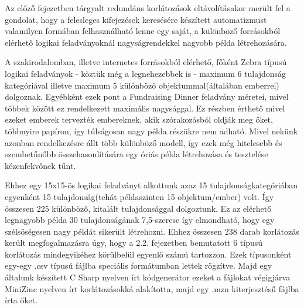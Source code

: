 \documentclass[12pt,a4paper,twoside, openright]{report}
\begin{document}
    Az előző fejezetben tárgyalt redundáns korlátozások eltávolításakor merült fel a gondolat, hogy a felesleges kifejezések keresésére készített automatizmust valamilyen formában felhasználható lenne egy saját, a különböző forrásokból elérhető logikai feladványoknál nagyságrendekkel nagyobb példa létrehozására.
    
    A szakirodalomban, illetve internetes forrásokból elérhető, főként Zebra típusú logikai feladványok - köztük még a legnehezebbek is - maximum 6 tulajdonság kategóriával illetve maximum 5 különböző objektummal(általában emberrel) dolgoznak. Egyébként ezek pont a Fundraising Dinner feladvány méretei, mivel többek között ez rendelkezett maximális nagysággal. Ez részben érthető mivel ezeket emberek tervezték embereknek, akik szórakozásból oldják meg őket, többnyire papíron, így túlságosan nagy példa részükre nem adható. Mivel nekünk azonban rendelkezésre állt több különböző modell, így ezek még hitelesebb és szembetűnőbb összehasonlítására egy óriás példa létrehozása és tesztelése kézenfekvőnek tűnt.
    
    Ehhez egy 15x15-ös logikai feladványt alkottunk azaz 15 tulajdonságkategóriában egyenként 15 tulajdonság(tehát példaszinten 15 objektum/ember) volt. Így összesen 225 különböző, kitalált tulajdonsággal dolgoztunk. Ez az elérhető legnagyobb példa 30 tulajdonságának 7,5-szerese így elmondható, hogy egy szélsőségesen nagy példát sikerült létrehozni. Ehhez összesen 238 darab korlátozás került megfogalmazásra úgy, hogy a 2.2. fejezetben bemutatott 6 típusú korlátozás mindegyikéhez körülbelül egyenlő számú tartozzon. Ezek típusonként egy-egy .csv típusú fájlba speciális formátumban lettek rögzítve. Majd egy általunk készített C Sharp nyelven írt kódgenerátor ezeket a fájlokat végigjárva MiniZinc nyelven írt korlátozásokká alakította, majd egy .mzn kiterjesztésű fájlba írta őket.
    
\end{document}
